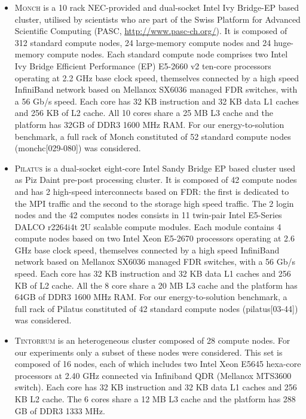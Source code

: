 \begin{itemize}

\item \textsc{Monch} is a 10 rack NEC-provided and dual-socket Intel  Ivy Bridge-EP
based  cluster, utilised  by  scientists  who are  part  of the  Swiss
Platform     for      Advanced     Scientific     Computing     (PASC,
\url{http://www.pasc-ch.org/}). It is composed of 312 standard compute
nodes, 24 large-memory compute nodes and 24 huge-memory compute nodes.
Each standard  compute node comprises  two Intel Ivy  Bridge Efficient
Performance (EP)  E5-2660 v2 ten-core processors operating  at 2.2 GHz
base  clock speed,  themselves connected  by a  high  speed InfiniBand
network based on Mellanox SX6036  managed FDR switches, with a 56 Gb/s
speed.  Each core  has 32 KB instruction and 32 KB  data L1 caches and
256  KB of L2  cache. All  10 cores  share a  25 MB  L3 cache  and the
platform has  32GB of  DDR3 1600 MHz  RAM. For  our energy-to-solution
benchmark, a  full rack  of Monch constituted  of 52  standard compute
nodes (monchc[029-080]) was considered.

\item \textsc{Pilatus} is a dual-socket eight-core Intel Sandy Bridge EP based
cluster used as Piz Daint pre-post processing cluster.  It is composed
of 42 compute  nodes and has 2 high-speed  interconnects based on FDR:
the  first is  dedicated to  the  MPI traffic  and the  second to  the
storage high  speed traffic.   The 2 login  nodes and the  42 computes
nodes  consists in  11  twin-pair Intel  E5-Series  DALCO r2264i4t  2U
scalable compute modules.  Each  module contains 4 compute nodes based
on two Intel  Xeon E5-2670 processors operating at  2.6 GHz base clock
speed, themselves  connected by a high speed  InfiniBand network based
on Mellanox  SX6036 managed FDR switches,  with a 56  Gb/s speed. Each
core has 32 KB  instruction and 32 KB data L1 caches  and 256 KB of L2
cache.  All  the 8 core share  a 20 MB  L3 cache and the  platform has
64GB of  DDR3 1600 MHz  RAM.  For our energy-to-solution  benchmark, a
full  rack  of  Pilatus  constituted  of  42  standard  compute  nodes
(pilatus[03-44]) was considered.

\item \textsc{Tintorrum} is an heterogeneous  cluster composed  of 28  compute nodes.
For our experiments only a subset of these nodes were considered. This
set is  composed of 16  nodes, each of  which includes two  Intel Xeon
E5645 hexa-core  processors at 2.40  GHz connected via  Infiniband QDR
(Mellanox MTS3600 switch).  Each core  has 32 KB instruction and 32 KB
data L1 caches and 256 KB L2 cache. The 6 cores share a 12 MB L3 cache
and the platform has 288 GB of DDR3 1333 MHz.

\end{itemize}
 
